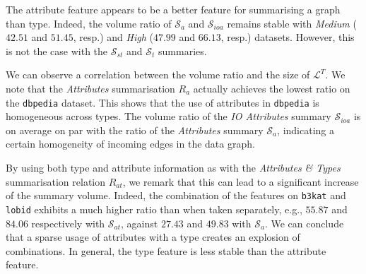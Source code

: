 The attribute feature appears to be a better feature for summarising a graph than type. Indeed, the volume ratio of $\mathcal{S}_a$ and $\mathcal{S}_{ioa}$ remains stable with \emph{Medium} ($42.51$ and $51.45$, resp.) and \emph{High} ($47.99$ and $66.13$, resp.) datasets. However, this is not the case with the $\mathcal{S}_{st}$ and $\mathcal{S}_t$ summaries. 

We can observe a correlation between the volume ratio and the size of $\mathcal{L}^T$.
We note that the \emph{Attributes} summarisation $R_a$ actually achieves the lowest ratio on the \texttt{dbpedia} dataset. This shows that the use of attributes in \texttt{dbpedia} is homogeneous across types. The volume ratio of the \emph{IO Attributes} summary $\mathcal{S}_{ioa}$ is on average on par with the ratio of the \emph{Attributes} summary $\mathcal{S}_a$, indicating a certain homogeneity of incoming edges in the data graph.

By using both type and attribute information as with the \emph{Attributes \& Types} summarisation relation $R_{at}$, we remark that this can lead to a significant increase of the summary volume. Indeed, the combination of the features on \texttt{b3kat} and \texttt{lobid} exhibits a much higher ratio than when taken separately, e.g., $55.87$ and $84.06$ respectively with $\mathcal{S}_{at}$, against $27.43$ and $49.83$ with $\mathcal{S}_a$. We can conclude that a sparse usage of attributes with a type creates an explosion of combinations. In general, the type feature is less stable than the attribute feature.

